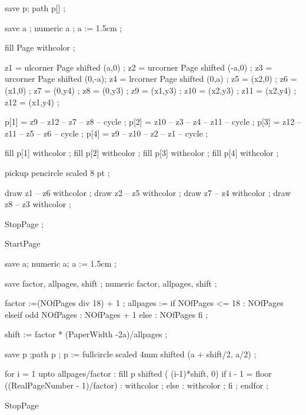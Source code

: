 save p; path p[] ;

save a ; numeric a ;
a := 1.5cm ;

fill Page withcolor  ;

z1 = ulcorner Page shifted (a,0) ; z2 = urcorner Page shifted (-a,0) ;
z3 = urcorner Page shifted (0,-a); z4 = lrcorner Page shifted (0,a)  ;
z5 = (x2,0) ;   z6 = (x1,0) ;
z7 = (0,y4) ;   z8 = (0,y3) ;
z9 = (x1,y3) ;  z10 = (x2,y3) ;
z11 = (x2,y4) ; z12 = (x1,y4) ;

p[1] = z9  -- z12 -- z7 -- z8  -- cycle ;
p[2] = z10 -- z3  -- z4 -- z11 -- cycle ;
p[3] = z12 -- z11 -- z5 -- z6  -- cycle ;
p[4] = z9  -- z10 -- z2 -- z1  -- cycle ;

fill p[1] withcolor  ;
fill p[2] withcolor  ;
fill p[3] withcolor  ;
fill p[4] withcolor  ;

pickup pencircle scaled 8 pt ;

draw z1 -- z6 withcolor  ;
draw z2 -- z5 withcolor  ;
draw z7 -- z4 withcolor  ;
draw z8 -- z3 withcolor  ;

StopPage ;
\stopuniqueMPgraphic

StartPage

save a; numeric a;
a := 1.5cm ;

save factor, allpages, shift ;
numeric factor, allpages, shift ;

factor :=(NOfPages div 18) + 1 ;
allpages := if NOfPages <= 18 : NOfPages elseif odd NOfPages : NOfPages + 1
            else : NOfPages fi ;

shift := factor * (PaperWidth -2a)/allpages ;

save p ;path p ;
p := fullcircle scaled 4mm shifted (a + shift/2, a/2) ;

for i = 1 upto allpages/factor :
  fill p shifted ( (i-1)*shift, 0)
    if i - 1 = floor ((RealPageNumber - 1)/factor) :
      withcolor  ;
    else :
      withcolor  ;
    fi ;
endfor ;


StopPage
\stopuseMPgraphic


